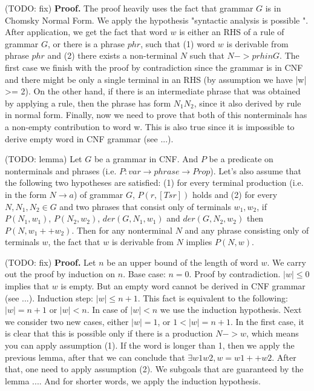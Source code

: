 (TODO: fix)
\textbf{Proof.}
The proof heavily uses the fact that grammar $G$ is in Chomsky Normal Form.
We apply the hypothesis "syntactic analysis is possible ". After application, we get the fact that word $w$ is either an RHS of a rule of grammar $G$, or there is a phrase $phr$, such that (1) word $w$ is derivable from phrase $phr$ and (2) there exists a non-terminal $N$ such that $N -> prh in G$.
The first case we finish with the proof by contradiction since the grammar is in CNF and there might be only a single terminal in an RHS (by assumption we have |w| >= 2).
On the other hand, if there is an intermediate phrase that was obtained by applying a rule, then the phrase has form $N_1 N_2$, since it also derived by rule in normal form.
Finally, now we need to prove that both of this nonterminals has a non-empty contribution to word w. This is also true since it is impossible to derive empty word in CNF grammar (see ...).

(TODO: lemma)
Let $G$ be a grammar in CNF. And $P$ be a predicate on nonterminals and phrases (i.e. $P: var \to phrase \to Prop$).
Let's also assume that the following two hypotheses are satisfied:
(1) for every terminal production (i.e. in the form $N \to a$) of grammar $G$, $P(r, [Ts r])$ holds and (2) for every $N, N_1, N_2 \in G$ and two phrases that consist only of terminals $w_1, w_2$, if $P(N_1, w_1)$, $P(N_2, w_2)$, $der(G, N_1, w_1)$ and $der(G, N_2, w_2)$ then $P(N, w_1 ++ w_2)$.
Then for any nonterminal $N$ and any phrase consisting only of terminals $w$, the fact that $w$ is derivable from $N$ implies $P(N,w)$.

(TODO: fix)
\textbf{Proof.} 
Let $n$ be an upper bound of the length of word $w$. We carry out the proof by induction on $n$. 
Base case: $ n = 0 $. Proof by contradiction. $|w| \le 0$ implies that $w$ is empty. But an empty word cannot be derived in CNF grammar (see ...).
Induction step: $|w| \le n+1$. This fact is equivalent to the following:  $|w| = n+1$ or $|w| < n$. 
In case of $|w| < n$ we use the induction hypothesis.
Next we consider two new cases, either $|w| = 1 $, or $1 < |w| = n + 1$.
In the first case, it is clear that this is possible only if there is a production $N -> w$, which means you can apply assumption (1).
If the word is longer than 1, then we apply the previous lemma, after that we can conclude that $\exists w1 w2, w = w1 ++ w2$. After that,
one need to apply assumption (2). We subgoals that are guaranteed by the lemma .... And for shorter words, we apply the induction hypothesis.

